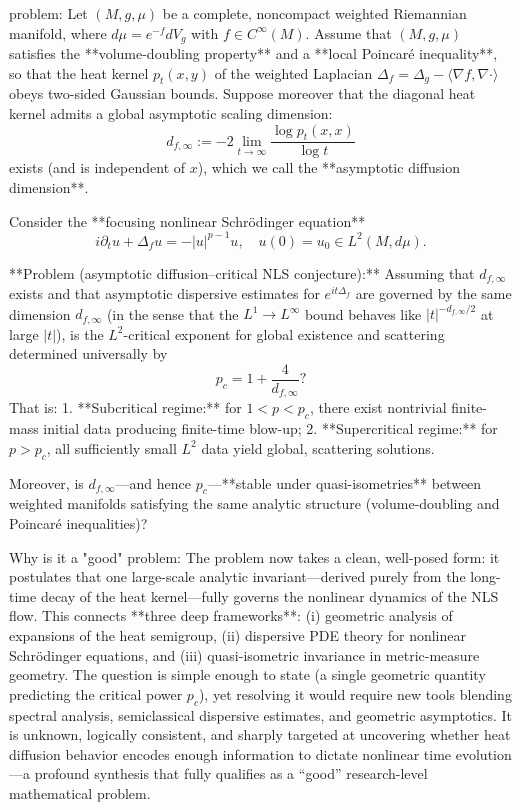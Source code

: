 problem:  
Let \((M,g,\mu)\) be a complete, noncompact weighted Riemannian manifold, where \(d\mu=e^{-f}dV_g\) with \(f\in C^\infty(M)\). Assume that \((M,g,\mu)\) satisfies the **volume-doubling property** and a **local Poincaré inequality**, so that the heat kernel \(p_t(x,y)\) of the weighted Laplacian \(\Delta_f=\Delta_g-\langle\nabla f,\nabla\cdot\rangle\) obeys two-sided Gaussian bounds.  
Suppose moreover that the diagonal heat kernel admits a global asymptotic scaling dimension:
\[
d_{f,\infty}:= -2\lim_{t\to\infty}\frac{\log p_t(x,x)}{\log t}
\]
exists (and is independent of \(x\)), which we call the **asymptotic diffusion dimension**.

Consider the **focusing nonlinear Schrödinger equation**
\[
i\partial_t u + \Delta_f u = -|u|^{p-1}u,\quad u(0)=u_0\in L^2(M,d\mu).
\]

**Problem (asymptotic diffusion–critical NLS conjecture):**  
Assuming that \(d_{f,\infty}\) exists and that asymptotic dispersive estimates for \(e^{it\Delta_f}\) are governed by the same dimension \(d_{f,\infty}\) (in the sense that the \(L^1\!\to\!L^\infty\) bound behaves like \(|t|^{-d_{f,\infty}/2}\) at large \(|t|\)), is the \(L^2\)-critical exponent for global existence and scattering determined universally by
\[
p_c=1+\frac{4}{d_{f,\infty}}?
\]
That is:
1. **Subcritical regime:** for \(1<p<p_c\), there exist nontrivial finite-mass initial data producing finite-time blow-up;
2. **Supercritical regime:** for \(p>p_c\), all sufficiently small \(L^2\) data yield global, scattering solutions.

Moreover, is \(d_{f,\infty}\)—and hence \(p_c\)—**stable under quasi-isometries** between weighted manifolds satisfying the same analytic structure (volume-doubling and Poincaré inequalities)?

Why is it a "good" problem:  
The problem now takes a clean, well-posed form: it postulates that one large-scale analytic invariant—derived purely from the long-time decay of the heat kernel—fully governs the nonlinear dynamics of the NLS flow. This connects **three deep frameworks**: (i) geometric analysis of expansions of the heat semigroup, (ii) dispersive PDE theory for nonlinear Schrödinger equations, and (iii) quasi-isometric invariance in metric-measure geometry. The question is simple enough to state (a single geometric quantity predicting the critical power \(p_c\)), yet resolving it would require new tools blending spectral analysis, semiclassical dispersive estimates, and geometric asymptotics. It is unknown, logically consistent, and sharply targeted at uncovering whether heat diffusion behavior encodes enough information to dictate nonlinear time evolution—a profound synthesis that fully qualifies as a “good” research-level mathematical problem.